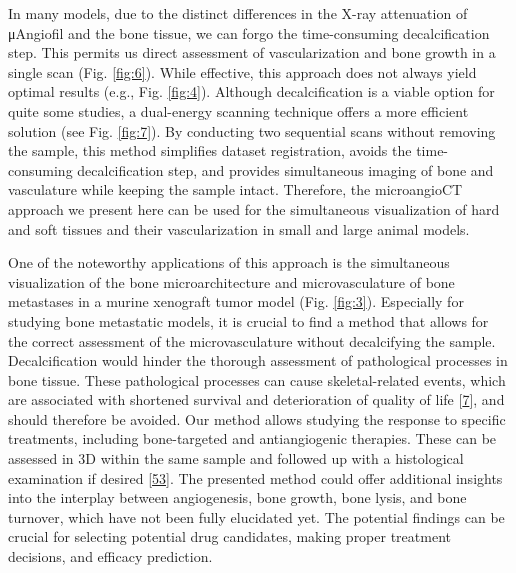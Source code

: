 In many models, due to the distinct differences in the X-ray attenuation of μAngiofil and the bone tissue, we can forgo the time-consuming decalcification step.
This permits us direct assessment of vascularization and bone growth in a single scan (Fig. \ref{fig:6}).
While effective, this approach does not always yield optimal results (e.g., Fig. \ref{fig:4}).
Although decalcification is a viable option for quite some studies, a dual-energy scanning technique offers a more efficient solution (see Fig. \ref{fig:7}).
By conducting two sequential scans without removing the sample, this method simplifies dataset registration, avoids the time-consuming decalcification step, and provides simultaneous imaging of bone and vasculature while keeping the sample intact.
Therefore, the microangioCT approach we present here can be used for the simultaneous visualization of hard and soft tissues and their vascularization in small and large animal models.

One of the noteworthy applications of this approach is the simultaneous visualization of the bone microarchitecture and microvasculature of bone metastases in a murine xenograft tumor model (Fig. \ref{fig:3}).
Especially for studying bone metastatic models, it is crucial to find a method that allows for the correct assessment of the microvasculature without decalcifying the sample.
Decalcification would hinder the thorough assessment of pathological processes in bone tissue.
These pathological processes can cause skeletal-related events, which are associated with shortened survival and deterioration of quality of life {[}\protect\hyperlink{ref-D7D7Wyla}{7}{]}, and should therefore be avoided.
Our method allows studying the response to specific treatments, including bone-targeted and antiangiogenic therapies.
These can be assessed in 3D within the same sample and followed up with a histological examination if desired {[}\protect\hyperlink{ref-15Cb0RCtH}{53}{]}.
The presented method could offer additional insights into the interplay between angiogenesis, bone growth, bone lysis, and bone turnover, which have not been fully elucidated yet.
The potential findings can be crucial for selecting potential drug candidates, making proper treatment decisions, and efficacy prediction.

